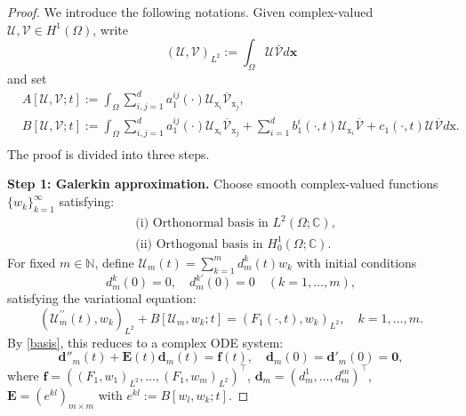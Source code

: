 \documentclass[11pt,reqno,oneside]{amsart}
\numberwithin{equation}{section}
\theoremstyle{definition}
\theoremstyle{remark}
\numberwithin{equation}{section}
\begin{document}
	\begin{proof}
		We introduce the following notations. 	Given complex-valued $\mathcal{U}, \mathcal{V} \in H^1(\Omega)$, write
		\begin{equation*}
			(\mathcal{U}, \mathcal{V})_{L^2}:=\int_\Omega \mathcal{U} \bar{\mathcal{V}} d \mathbf{x}
		\end{equation*}
		and set 	
		\begin{equation*}
			\begin{aligned}
				&A[\mathcal{U}, \mathcal{V};t]:=\int_\Omega \sum_{i, j=1}^d a^{i j}_1(\cdot) \mathcal{U}_{\mathrm{x}_i} \overline{\mathcal{V}}_{\mathrm{x}_j},\\
				&B[\mathcal{U}, \mathcal{V};t]:=\int_\Omega \sum_{i, j=1}^d a^{i j}_1(\cdot) \mathcal{U}_{\mathrm{x}_i} \overline{\mathcal{V}}_{\mathrm{x}_j}+\sum_{i=1}^d b^i_1(\cdot,t) \mathcal{U}_{\mathrm{x}_i} \overline{\mathcal{V}}+c_1(\cdot,t) \mathcal{U} \overline{\mathcal{V}} d \mathrm{x}.\\
			\end{aligned}
		\end{equation*}
		The proof is divided into three steps.
		
		
		\medskip
		\textbf{Step 1: Galerkin approximation.}  
		Choose smooth complex-valued functions $\{w_k\}_{k=1}^{\infty}$ satisfying:
		\begin{equation}\label{basis}
			\begin{aligned}
				&\text{(i) Orthonormal basis in } L^2(\Omega;\mathbb{C}) ,\\
				&\text{(ii) Orthogonal basis in } H^1_0(\Omega;\mathbb{C}).
			\end{aligned}
		\end{equation}
		For fixed $m \in \mathbb{N}$, define $\mathcal{U}_m(t) = \sum_{k=1}^{m} d_m^k(t) w_k$ with initial conditions
		\begin{equation}\label{zero condition}
			d_m^k(0) = 0, \quad d_m^{k\prime}(0) = 0 \quad (k=1,\dots,m),
		\end{equation}
		satisfying the variational equation:
		\begin{equation}\label{eq 3.6}
			\left( \mathcal{U}^{\prime\prime}_m(t), w_k \right)_{L^2} + B[\mathcal{U}_m, w_k; t] = \left( F_1(\cdot,t), w_k \right)_{L^2}, \quad k=1,\dots,m.
		\end{equation}
		By \eqref{basis}, this reduces to a complex ODE system:
		\begin{equation*}
			\mathbf{d}''_m(t) + \mathbf{E}(t)\mathbf{d}_m(t) = \mathbf{f}(t), \quad 
			\mathbf{d}_m(0) = \mathbf{d}'_m(0) = \mathbf{0},
		\end{equation*}
		where $\mathbf{f} = \left( (F_1, w_1)_{L^2}, \dots, (F_1, w_m)_{L^2} \right)^\top$, $\mathbf{d}_m = (d_m^1, \dots, d_m^m)^\top$, $\mathbf{E} = (e^{kl})_{m\times m}$ with $e^{kl} := B[w_l, w_k; t]$.
		

\end{proof}
\end{document}
